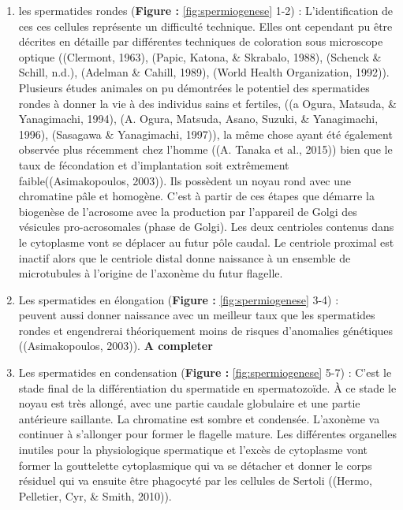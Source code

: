 \documentclass[12pt,twoside]{reedthesis}
\providecommand{\tightlist}{%
  \setlength{\itemsep}{0pt}\setlength{\parskip}{0pt}}
\theoremstyle{definition}
\theoremstyle{definition}
\theoremstyle{remark}
\begin{document}
  \begin{enumerate}
  \def\labelenumi{\arabic{enumi}.}
  \tightlist
  \item
    les spermatides rondes (\textbf{Figure : }\ref{fig:spermiogenese} 1-2)
    : L'identification de ces ces cellules représente un difficulté
    technique. Elles ont cependant pu être décrites en détaille par
    différentes techniques de coloration sous microscope optique
    ((Clermont, 1963), (Papic, Katona, \& Skrabalo, 1988), (Schenck \&
    Schill, n.d.), (Adelman \& Cahill, 1989), (World Health Organization,
    1992)). Plusieurs études animales on pu démontrées le potentiel des
    spermatides rondes à donner la vie à des individus sains et fertiles,
    ((a Ogura, Matsuda, \& Yanagimachi, 1994), (A. Ogura, Matsuda, Asano,
    Suzuki, \& Yanagimachi, 1996), (Sasagawa \& Yanagimachi, 1997)), la
    même chose ayant été également observée plus récemment chez l'homme
    ((A. Tanaka et al., 2015)) bien que le taux de fécondation et
    d'implantation soit extrêmement faible((Asimakopoulos, 2003)). Ils
    possèdent un noyau rond avec une chromatine pâle et homogène. C'est à
    partir de ces étapes que démarre la biogenèse de l'acrosome avec la
    production par l'appareil de Golgi des vésicules pro-acrosomales
    (phase de Golgi). Les deux centrioles contenus dans le cytoplasme vont
    se déplacer au futur pôle caudal. Le centriole proximal est inactif
    alors que le centriole distal donne naissance à un ensemble de
    microtubules à l'origine de l'axonème du futur flagelle.\\
  \item
    Les spermatides en élongation (\textbf{Figure :
    }\ref{fig:spermiogenese} 3-4) :\\
    peuvent aussi donner naissance avec un meilleur taux que les
    spermatides rondes et engendrerai théoriquement moins de risques
    d'anomalies génétiques ((Asimakopoulos, 2003)). \textbf{A completer}\\
  \item
    Les spermatides en condensation (\textbf{Figure :
    }\ref{fig:spermiogenese} 5-7) : C'est le stade final de la
    différentiation du spermatide en spermatozoïde. À ce stade le noyau
    est très allongé, avec une partie caudale globulaire et une partie
    antérieure saillante. La chromatine est sombre et condensée. L'axonème
    va continuer à s'allonger pour former le flagelle mature. Les
    différentes organelles inutiles pour la physiologique spermatique et
    l'excès de cytoplasme vont former la gouttelette cytoplasmique qui va
    se détacher et donner le corps résiduel qui va ensuite être phagocyté
    par les cellules de Sertoli ((Hermo, Pelletier, Cyr, \& Smith, 2010)).
  \end{enumerate}
  
\end{document}

